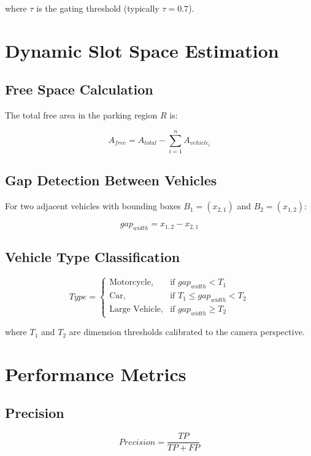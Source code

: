 \documentclass[12pt,a4paper]{report}
\begin{document}
where $\tau$ is the gating threshold (typically $\tau = 0.7$).


\section{Dynamic Slot Space Estimation}

\subsection{Free Space Calculation}

The total free area in the parking region $R$ is:

\begin{equation}
A_{free} = A_{total} - \sum_{i=1}^{n} A_{vehicle_i}
\end{equation}

\subsection{Gap Detection Between Vehicles}

For two adjacent vehicles with bounding boxes $B_1 = (x_{2,1})$ and $B_2 = (x_{1,2})$:

\begin{equation}
gap_{width} = x_{1,2} - x_{2,1}
\end{equation}

\subsection{Vehicle Type Classification}

\begin{equation}
Type =
\begin{cases}
\text{Motorcycle}, & \text{if } gap_{width} < T_1 \\
\text{Car}, & \text{if } T_1 \leq gap_{width} < T_2 \\
\text{Large Vehicle}, & \text{if } gap_{width} \geq T_2
\end{cases}
\end{equation}

where $T_1$ and $T_2$ are dimension thresholds calibrated to the camera perspective.


\section{Performance Metrics}

\subsection{Precision}
\begin{equation}
Precision = \frac{TP}{TP + FP}
\end{equation}
\end{document}
